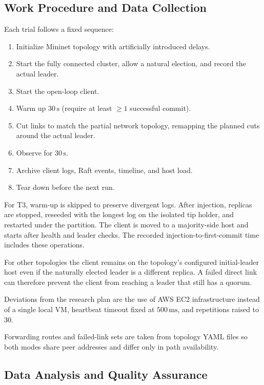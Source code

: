 \documentclass[11pt,a4paper]{article}
\begin{document}
\subsection{Work Procedure and Data Collection}
\label{sec:procedure}

Each trial follows a fixed sequence:

\begin{enumerate}
  \item Initialize Mininet topology with artificially introduced delays.
  \item Start the fully connected cluster, allow a natural election, and record the actual leader.
  \item Start the open-loop client.
  \item Warm up \(30\,\mathrm{s}\) (require at least \(\geq 1\) successful commit).
  \item Cut links to match the partial network topology, remapping the planned cuts around the actual leader.
  \item Observe for \(30\,\mathrm{s}\).
  \item Archive client logs, Raft events, timeline, and host load.
  \item Tear down before the next run.
\end{enumerate}

For T3, warm-up is skipped to preserve divergent logs. After injection, replicas are stopped, reseeded with the longest log on the isolated tip holder, and restarted under the partition. The client is moved to a majority-side host and starts after health and leader checks. The recorded injection-to-first-commit time includes these operations.

For other topologies the client remains on the topology's configured initial-leader host even if the naturally elected leader is a different replica. A failed direct link can therefore prevent the client from reaching a leader that still has a quorum.

Deviations from the research plan are the use of AWS EC2 infrastructure instead of a single local VM, heartbeat timeout fixed at \(500\,\mathrm{ms}\), and repetitions raised to \(30\).

Forwarding routes and failed-link sets are taken from topology YAML files so both modes share peer addresses and differ only in path availability.

\subsection{Data Analysis and Quality Assurance}
\end{document}
